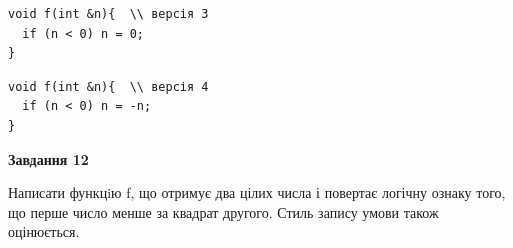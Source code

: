 \documentclass[12pt, ukrainian]{article}
\begin{document}
{\begin {large}
\begin{minipage}[t]{11.0cm}
\vspace{-8mm}\begin{verbatim}
void f(int &n){  \\ версія 3
  if (n < 0) n = 0;
}
\end{verbatim}

\vspace{-8mm}\begin{verbatim}
void f(int &n){  \\ версія 4
  if (n < 0) n = -n;
}
\end{verbatim}



\begin{center}
\textbf{Завдання 12}
\end{center}

Написати функцiю f, що отримує два цілих числа і повертає логічну ознаку того, що перше число менше за квадрат другого. Стиль запису умови також оцінюється.\par

\end{minipage}

\end {large}}
\newpage
\end{document}
